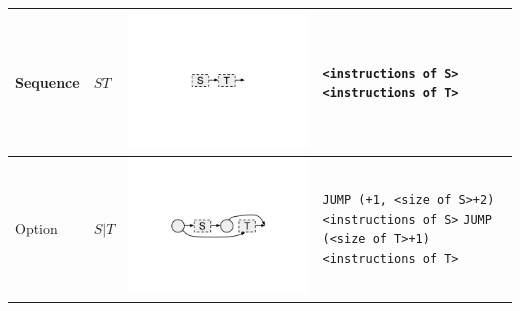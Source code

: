 \documentclass{llncs}
\begin{document}
\begin{table}
\begin{center}
\begin{tabular}{ >{\centering\arraybackslash}m{0.6in} | >{\centering\arraybackslash}m{0.7in} | >{\centering\arraybackslash}m{1.3in} | m{1.8in} }
		\hline
		Sequence & $ST$ & \includegraphics[trim=4in 4in 4in 3.8in, scale=0.20]{figures/thompson_sequence.pdf} &
            \texttt{<instructions of S>} \newline
            \texttt{<instructions of T>}
        \\
		\hline
		Option & $S|T$ & \includegraphics[trim=4in 3.7in 4in 3.5in, scale=0.20]{figures/thompson_option.pdf} &
            \texttt{JUMP (+1, <size of S>+2)} \newline
            \texttt{<instructions of S>} \newline
            \texttt{JUMP (<size of T>+1)} \newline
            \texttt{<instructions of T>}
        \\

\end{tabular}
\end{center}
\end{table}
\end{document}
